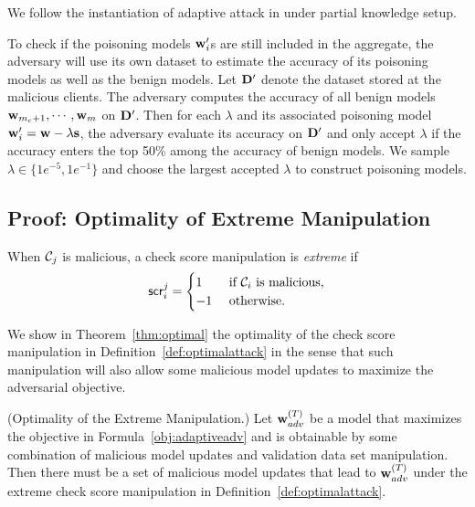 We follow the instantiation of adaptive attack in \citet{fltrust} under partial knowledge setup.

To check if the poisoning models $\mathbf{w}'_{i}$s are still included in the aggregate, the adversary will use its own dataset to estimate the accuracy of its poisoning models as well as the benign models. Let $\mathbf{D}'$ denote the dataset stored at the malicious clients. The adversary computes the accuracy of all benign models $\mathbf{w}_{m_c+1}, \cdots, \mathbf{w}_{m}$ on $\mathbf{D}'$. Then for each $\lambda$ and its associated poisoning model $\mathbf{w}_i' = \mathbf{w} - \lambda\mathbf{s}$, the adversary evaluate its accuracy on $\mathbf{D}'$ and only accept $\lambda$ if the accuracy enters the top 50\% among the accuracy of benign models. We sample $\lambda\in\{1e^{-5}, 1e^{-1}\}$ and choose the largest accepted $\lambda$ to construct poisoning models.

\subsection{Proof: Optimality of Extreme Manipulation}
\label{app:extrememanipultationproof}

\begin{definition}
\label{def:optimalattack}
When $\mathcal{C}_{j}$ is malicious, a check score manipulation is \emph{extreme} if
\begin{equation}
\label{eqn:extreme}
\score{i}{j} =
\begin{cases}
1 &\mbox{ if $\calC_i$ is malicious,}\\
-1 &\mbox{ otherwise.}
\end{cases}
\end{equation}
\end{definition}



We show in Theorem~\ref{thm:optimal} the optimality of the check score manipulation in Definition~\ref{def:optimalattack} in the sense that such manipulation will also allow some malicious model updates to maximize the adversarial objective. 
\begin{theorem}(Optimality of the Extreme Manipulation.)
\label{thm:optimal}
    Let $\mathbf{w}^{(T)}_{adv}$ be a model that maximizes the objective in Formula~\ref{obj:adaptiveadv} and is obtainable by some combination of malicious model updates and validation data set manipulation. Then there must be a set of malicious model updates that lead to $\mathbf{w}^{(T)}_{adv}$ under the extreme check score manipulation in Definition~\ref{def:optimalattack}.
\end{theorem}



